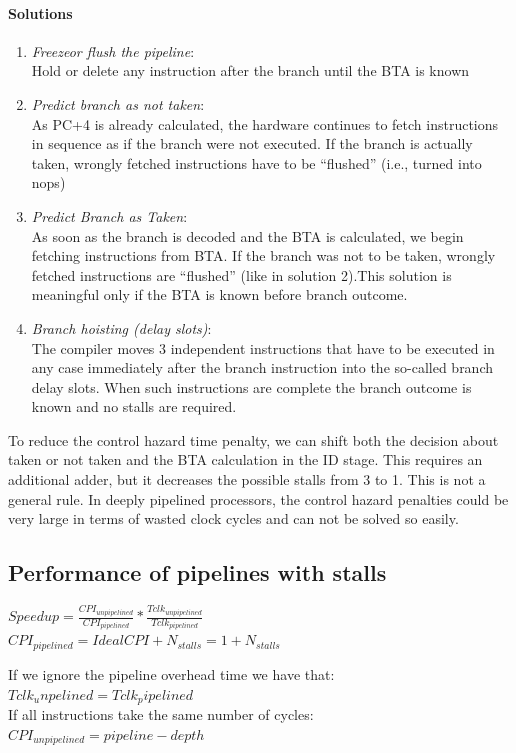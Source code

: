 \paragraph{Solutions}
\begin{enumerate}
    \item \textit{Freezeor flush the pipeline}:\\
    Hold or delete any instruction after the branch until the BTA is known
    \item \textit{Predict branch as not taken}:\\
    As PC+4 is already calculated, the hardware continues to fetch instructions in sequence as if the branch were not executed. If the branch is actually taken, wrongly fetched instructions have to be “flushed” (i.e., turned into nops)
    \item \textit{Predict Branch as Taken}:\\
    As soon as the branch is decoded and the BTA is calculated, we begin fetching instructions from BTA. If the branch was not to be taken, wrongly fetched instructions are “flushed” (like in solution 2).This solution is meaningful only if the BTA is known before branch outcome.
    \item \textit{Branch hoisting (delay slots)}:\\
    The compiler moves 3 independent instructions that have to be executed in any case immediately after the branch instruction into the so-called branch delay slots. When such instructions are complete the branch outcome is known and no stalls are required.
\end{enumerate}

To reduce the control hazard time penalty, we can shift both the decision about taken or not taken and the BTA calculation in the ID stage. This requires an additional adder, but it decreases the possible stalls from 3 to 1.
This is not a general rule. In deeply pipelined processors, the control hazard penalties could be very large in terms of wasted clock cycles and can not be solved so easily.

\subsection{Performance of pipelines with stalls}
$Speedup = \frac{CPI_{unpipelined}}{CPI_{pipelined}} * \frac{Tclk_{unpipelined}}{Tclk_{pipelined}}$
\\
$CPI_{pipelined} = Ideal CPI + N_{stalls} = 1 + N_{stalls}$

If we ignore the pipeline overhead time we have that: $Tclk_unpelined = Tclk_pipelined$\\
If all instructions take the same number of cycles: $CPI_{unpipelined} = pipeline-depth$

